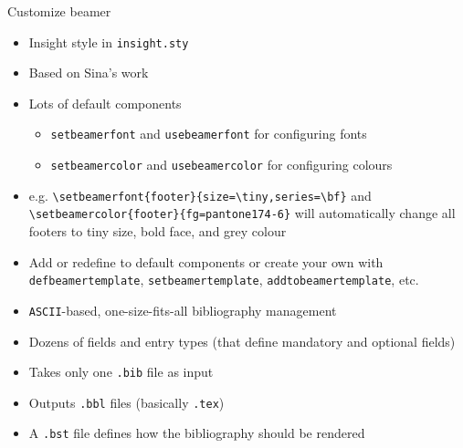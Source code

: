 \documentclass[english]{beamer}
\let\olditem\item
\renewcommand{\item}{\setlength{\itemsep}{\fill}\olditem}
\newenvironment{sitemize}{\let\item\olditem \begin{itemize}}{\vfill\end{itemize}}
\let\textttt\texttt
\renewcommand{\texttt}[1]{\colorbox{gray!10}{\textttt{#1}}}
\begin{document}
\begin{frame}[fragile]{Customize beamer}
    \begin{itemize}
        \item Insight style in \texttt{insight.sty}
        \item Based on Sina's work
        \item Lots of default components 
        \begin{sitemize}
            \item \texttt{setbeamerfont} and \texttt{usebeamerfont} for configuring fonts
            \item \texttt{setbeamercolor} and \texttt{usebeamercolor} for configuring colours
        \end{sitemize}
        \item e.g. \verb|\setbeamerfont{footer}{size=\tiny,series=\bf}| and \verb|\setbeamercolor{footer}{fg=pantone174-6}| will automatically change all footers to tiny size, bold face, and grey colour
        \item Add or redefine to default components or create your own with \texttt{defbeamertemplate}, \texttt{setbeamertemplate}, \texttt{addtobeamertemplate}, etc.
    \end{itemize}
\end{frame}

\begin{frame}{}
    \begin{itemize}
        \item \texttt{ASCII}-based, one-size-fits-all bibliography management
        \item Dozens of fields and entry types (that define mandatory and optional fields)
        \item Takes only one \texttt{.bib} file as input
        \item Outputs \texttt{.bbl} files (basically \texttt{.tex})
        \item A \texttt{.bst} file defines how the bibliography should be rendered
    \end{itemize}
\end{frame}
\end{document}
